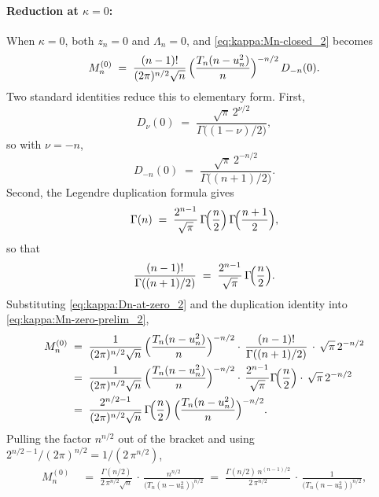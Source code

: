 \documentclass{article}%
\begin{document}
\paragraph{Reduction at $\kappa = 0$:}

When $\kappa = 0$, both $z_n = 0$ and $\Lambda_n = 0$, and
\eqref{eq:kappa:Mn-closed_2} becomes
\begin{equation}
  M_n^{(0)}
  \;=\;
  \frac{(n-1)!}{(2\pi)^{n/2}\sqrt n}\,
  \Bigl(\frac{T_n(n - u_n^2)}{n}\Bigr)^{-n/2}\,
  D_{-n}(0).
  \label{eq:kappa:Mn-zero-prelim_2}
\end{equation}
Two standard identities reduce this to elementary form.  First,
\begin{equation}
  D_\nu(0) \;=\;
  \frac{\sqrt\pi\, 2^{\nu/2}}{\Gamma\!\bigl((1-\nu)/2\bigr)},
  \label{eq:kappa:Dnu-at-zero_2}
\end{equation}
so with $\nu = -n$,
\begin{equation}
  D_{-n}(0)
  \;=\;
  \frac{\sqrt\pi\, 2^{-n/2}}{\Gamma\!\bigl((n+1)/2\bigr)}.
  \label{eq:kappa:Dn-at-zero_2}
\end{equation}
Second, the Legendre duplication formula gives
\begin{equation}
  \Gamma(n)
  \;=\;
  \frac{2^{n-1}}{\sqrt\pi}\,
  \Gamma\!\Bigl(\frac{n}{2}\Bigr)\,
  \Gamma\!\Bigl(\frac{n+1}{2}\Bigr),
  \label{eq:kappa:duplication_2}
\end{equation}
so that
\[
  \frac{(n-1)!}{\Gamma((n+1)/2)}
  \;=\;
  \frac{2^{n-1}}{\sqrt\pi}\,
  \Gamma\!\Bigl(\frac{n}{2}\Bigr).
\]
Substituting \eqref{eq:kappa:Dn-at-zero_2} and the duplication
identity into \eqref{eq:kappa:Mn-zero-prelim_2},
\begin{align*}
  M_n^{(0)}
  &\;=\;
  \frac{1}{(2\pi)^{n/2}\sqrt n}\,
  \Bigl(\frac{T_n(n - u_n^2)}{n}\Bigr)^{-n/2}
  \cdot\,
  \frac{(n-1)!}{\Gamma((n+1)/2)}\,
  \cdot\,
  \sqrt\pi\, 2^{-n/2}\\
  &\;=\;
  \frac{1}{(2\pi)^{n/2}\sqrt n}\,
  \Bigl(\frac{T_n(n - u_n^2)}{n}\Bigr)^{-n/2}
  \cdot\,
  \frac{2^{n-1}}{\sqrt\pi} \Gamma\!\Bigl(\frac{n}{2}\Bigr)
  \cdot\,
  \sqrt\pi\, 2^{-n/2}\\
  &\;=\;
  \frac{2^{n/2 - 1}}{(2\pi)^{n/2}\sqrt n}\,
  \Gamma\!\Bigl(\frac{n}{2}\Bigr)\,
  \Bigl(\frac{T_n(n - u_n^2)}{n}\Bigr)^{-n/2}.
\end{align*}
Pulling the factor $n^{n/2}$ out of the bracket and using
$2^{n/2 - 1} / (2\pi)^{n/2} = 1/(2\,\pi^{n/2})$,
\begin{align*}
  M_n^{(0)}
  &\;=\;
  \frac{\Gamma(n/2)}{2\,\pi^{n/2}\sqrt n}\,
  \cdot\,
  \frac{n^{n/2}}{\bigl(T_n(n - u_n^2)\bigr)^{n/2}}
  \;=\;
  \frac{\Gamma(n/2)\, n^{(n-1)/2}}{2\,\pi^{n/2}}\,
  \cdot\,
  \frac{1}{\bigl(T_n(n - u_n^2)\bigr)^{n/2}},
\end{align*}
\end{document}
